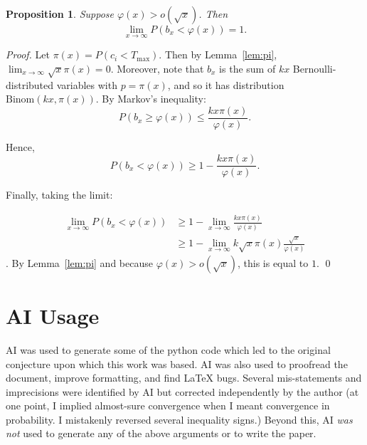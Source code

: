 \documentclass[11pt]{article}
\newtheorem{proposition}[theorem]{Proposition}
\theoremstyle{definition}
\begin{document}
\begin{proposition}
    Suppose $\varphi(x) > o(\sqrt{x})$.  Then 
    \[\lim_{x\rightarrow \infty } P\left(b_x < \varphi(x)\right) =1.\]
\end{proposition}
\begin{proof}
    Let $\pi(x) = P\left(c_i < T_{\max}\right)$.  Then by Lemma~\ref{lem:pi}, $\lim_{x\rightarrow \infty}\sqrt{x}\pi(x) = 0$.
    Moreover, note that $b_x$ is the sum of $kx$ Bernoulli-distributed variables with $p=\pi(x)$, and so it has distribution 
    $\text{Binom}(kx,\pi(x))$.  By Markov's inequality:
    \[P\left(b_x \ge \varphi(x)\right) \le \frac{kx\pi(x)}{\varphi(x)}.\]

    Hence,
    \[P\left(b_x < \varphi(x)\right) \ge 1 - \frac{kx\pi(x)}{\varphi(x)}.\]

    Finally, taking the limit:

    \begin{align}
        \lim_{x\rightarrow \infty} P\left(b_x < \varphi(x)\right) &\ge 1 - \lim_{x\rightarrow \infty} \frac{kx\pi(x)}{\varphi(x)} \\
        &\ge 1 - \lim_{x\rightarrow \infty} k\sqrt{x}\pi(x)\frac{\sqrt{x}}{\varphi(x)}
    \end{align}.
    By Lemma~\ref{lem:pi} and because $\varphi(x) > o(\sqrt{x})$, this is equal to $1$. \qed
\end{proof}

\section{AI Usage}
AI was used to generate some of the python code which led to the original conjecture upon which this work
was based.  AI was also used to proofread the document, improve formatting, and find LaTeX bugs.  Several mis-statements and imprecisions were identified by AI 
but corrected independently by the author (at one point, I implied almost-sure convergence when I meant convergence in probability.  
I mistakenly reversed several inequality signs.)  Beyond this, AI \textit{was not} used
to generate any of the above arguments or to write the paper.

%   
\end{document}

